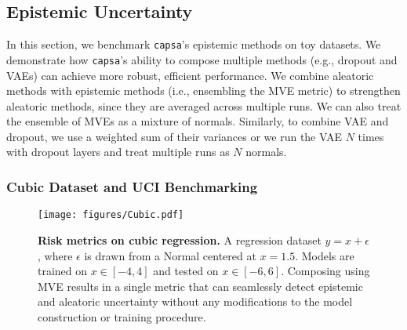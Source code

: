 \documentclass{article} %
\def\capsa{\texttt{{capsa}}}
\begin{document}
\subsection{Epistemic Uncertainty}

In this section, we benchmark \capsa's epistemic methods on toy datasets. We demonstrate how \capsa's ability to compose multiple methods (e.g.,  dropout and VAEs) can achieve more robust, efficient performance. We combine aleatoric methods with epistemic methods (i.e., ensembling the MVE metric) to strengthen aleatoric methods, since they are averaged across multiple runs. We can also treat the ensemble of MVEs as a mixture of normals. Similarly, to combine VAE and dropout, we use a weighted sum of their variances or we run the VAE $N$ times with dropout layers and treat multiple runs as $N$ normals.

\subsubsection{Cubic Dataset and UCI Benchmarking}

\begin{figure}[t!]
\centering
\texttt{[image: figures/Cubic.pdf]}
\vspace{-15pt}
\caption{\textbf{Risk metrics on cubic regression.} A regression dataset $y = x + \epsilon$, where $\epsilon$ is drawn from a Normal centered at $x=1.5$. Models are trained on $x \in [-4,4]$ and tested on $x \in [-6,6]$. Composing using MVE results in a single metric that can seamlessly detect epistemic and aleatoric uncertainty without any modifications to the model construction or training procedure.}
\vspace{-10pt}
\label{fig:cubics}
\end{figure}
\end{document}
